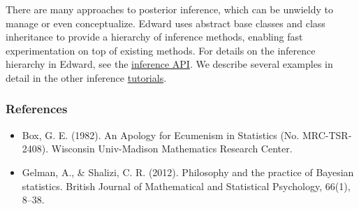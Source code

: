 There are many approaches to posterior inference, which can be unwieldy to
manage or even conceptualize. Edward uses abstract base classes and class
inheritance to provide a hierarchy of inference methods, enabling fast
experimentation on top of existing methods. For details on the inference
hierarchy in Edward, see the
\href{api/inferences.html}{inference API}. We describe several examples in
detail in the other inference \href{tutorials.html}{tutorials}.


\subsubsection{References}\label{references}

\begin{itemize}
\item
  Box, G. E. (1982). An Apology for Ecumenism in Statistics (No.
  MRC-TSR-2408). Wisconsin Univ-Madison Mathematics Research Center.
\item
  Gelman, A., & Shalizi, C. R. (2012). Philosophy and the practice of
  Bayesian statistics. British Journal of Mathematical and Statistical
  Psychology, 66(1), 8–38.
\end{itemize}
